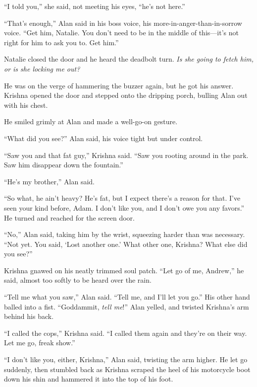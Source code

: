 \documentclass{article}
\begin{document}
``I told you,'' she said, not meeting his eyes, ``he's not here.''

``That's enough,'' Alan said in his boss voice, his
more-in-anger-than-in-sorrow voice.  ``Get him, Natalie.  You don't
need to be in the middle of this---it's not right for him to ask you
to.  Get him.''

Natalie closed the door and he heard the deadbolt turn.  \textit{Is
she going to fetch him, or is she locking me out?}

He was on the verge of hammering the buzzer again, but he got his
answer.  Krishna opened the door and stepped onto the dripping porch,
bulling Alan out with his chest.

He smiled grimly at Alan and made a well-go-on gesture.

``What did you see?'' Alan said, his voice tight but under control.

``Saw you and that fat guy,'' Krishna said.  ``Saw you rooting around
in the park.  Saw him disappear down the fountain.''

``He's my brother,'' Alan said.

``So what, he ain't heavy?  He's fat, but I expect there's a reason
for that.  I've seen your kind before, Adam.  I don't like you, and I
don't owe you any favors.'' He turned and reached for the screen door.

``No,'' Alan said, taking him by the wrist, squeezing harder than was
necessary.  ``Not yet.  You said, `Lost another one.' What other one,
Krishna?  What else did you see?''

Krishna gnawed on his neatly trimmed soul patch.  ``Let go of me,
Andrew,'' he said, almost too softly to be heard over the rain.

``Tell me what you saw,'' Alan said.  ``Tell me, and I'll let you
go.'' His other hand balled into a fist.  ``Goddammit, \textit{tell
me}!'' Alan yelled, and twisted Krishna's arm behind his back.

``I called the cops,'' Krishna said.  ``I called them again and
they're on their way.  Let me go, freak show.''

``I don't like you, either, Krishna,'' Alan said, twisting the arm
higher.  He let go suddenly, then stumbled back as Krishna scraped the
heel of his motorcycle boot down his shin and hammered it into the top
of his foot.
\end{document}

